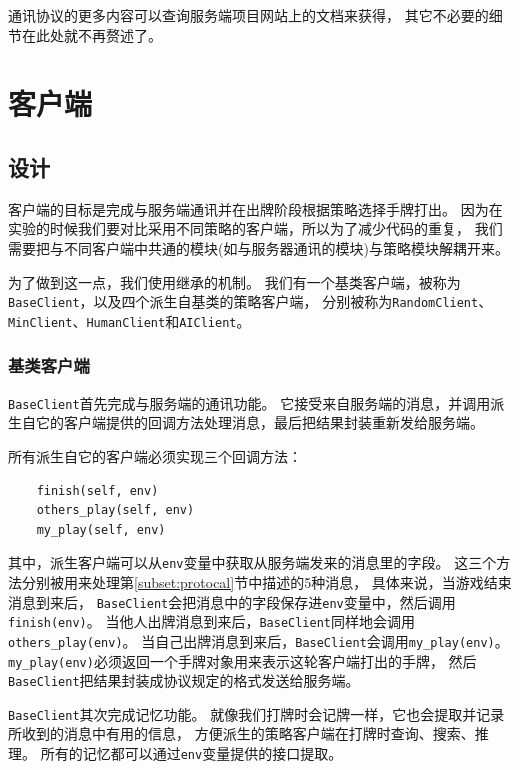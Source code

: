 \documentclass[a4paper]{ctexart}
\begin{document}
通讯协议的更多内容可以查询服务端项目网站\cite{jsai}上的文档来获得，
其它不必要的细节在此处就不再赘述了。

\section{客户端} \label{sec:client}
\subsection{设计}
客户端的目标是完成与服务端通讯并在出牌阶段根据策略选择手牌打出。
因为在实验的时候我们要对比采用不同策略的客户端，所以为了减少代码的重复，
我们需要把与不同客户端中共通的模块(如与服务器通讯的模块)与策略模块解耦开来。

为了做到这一点，我们使用继承的机制。
我们有一个基类客户端，被称为\texttt{BaseClient}，以及四个派生自基类的策略客户端，
分别被称为\texttt{RandomClient}、\texttt{MinClient}、\texttt{HumanClient}和\texttt{AIClient}。

\subsubsection{基类客户端}
\texttt{BaseClient}首先完成与服务端的通讯功能。
它接受来自服务端的消息，并调用派生自它的客户端提供的回调方法处理消息，最后把结果封装重新发给服务端。

所有派生自它的客户端必须实现三个回调方法：
\begin{verbatim}
    finish(self, env)
    others_play(self, env)
    my_play(self, env)
\end{verbatim}
其中，派生客户端可以从\texttt{env}变量中获取从服务端发来的消息里的字段。
这三个方法分别被用来处理第\ref{subset:protocal}节中描述的5种消息，
具体来说，当游戏结束消息到来后，
\texttt{BaseClient}会把消息中的字段保存进\texttt{env}变量中，然后调用\texttt{finish(env)}。
当他人出牌消息到来后，\texttt{BaseClient}同样地会调用\texttt{others\_play(env)}。
当自己出牌消息到来后，\texttt{BaseClient}会调用\texttt{my\_play(env)}。
\texttt{my\_play(env)}必须返回一个手牌对象用来表示这轮客户端打出的手牌，
然后\texttt{BaseClient}把结果封装成协议规定的格式发送给服务端。

\texttt{BaseClient}其次完成记忆功能。
就像我们打牌时会记牌一样，它也会提取并记录所收到的消息中有用的信息，
方便派生的策略客户端在打牌时查询、搜索、推理。
所有的记忆都可以通过\texttt{env}变量提供的接口提取。
\end{document}
